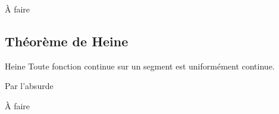 \documentclass[a4paper, 12pt]{article}
\begin{document}
\begin{demonstration}
    \begin{hotwarn}
        À faire
    \end{hotwarn}
\end{demonstration}

\subsection{Théorème de Heine}

\begin{theoreme}{Heine}{}
    Toute fonction continue sur un segment est uniformément continue.
\end{theoreme}

\begin{demonstration}
    Par l'absurde
    \begin{hotwarn}
        À faire
    \end{hotwarn}
\end{demonstration}
\end{document}
